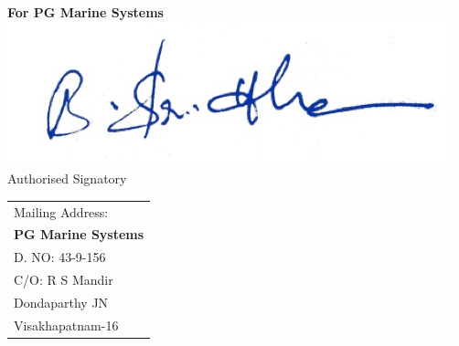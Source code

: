 \documentclass[11pt,a4]{article}
\begin{document}
\vspace*{105pt}


{\bf For PG Marine Systems} \\ 
\hspace*{.5cm}\includegraphics{signharsh}\\
 \hspace*{0.6cm}Authorised Signatory
\vspace*{-72pt}
\begin{flushright}
\begin{tabular}{l}
Mailing Address:\\
{\bf PG Marine Systems}\\
D. NO: 43-9-156\\
C/O: R S Mandir\\
Dondaparthy JN\\ 
Visakhapatnam-16\\
\end{tabular}
\end{flushright}
\end{document}
